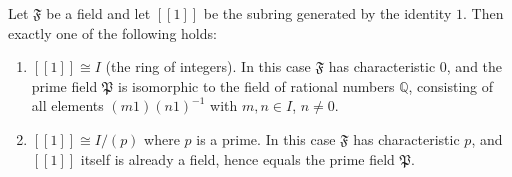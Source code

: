Let $\mathfrak{F}$ be a field and let $[[1]]$ be the subring generated by the identity $1$. Then exactly one of the following holds:
\begin{enumerate}
\item[(I)] $[[1]] \cong I$ (the ring of integers). In this case $\mathfrak{F}$ has characteristic $0$, and the prime field $\mathfrak{P}$ is isomorphic to the field of rational numbers $\mathbb{Q}$, consisting of all elements $(m1)(n1)^{-1}$ with $m, n \in I$, $n \neq 0$.
\item[(II)] $[[1]] \cong I/(p)$ where $p$ is a prime. In this case $\mathfrak{F}$ has characteristic $p$, and $[[1]]$ itself is already a field, hence equals the prime field $\mathfrak{P}$.
\end{enumerate}
